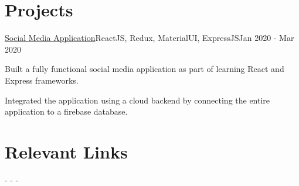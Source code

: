\documentclass[letterpaper]{resume_config}
\begin{document}
\section{Projects}
\Project
    {\href{https://github.com/yk-2310/Social-app}{Social Media Application}}{ReactJS, Redux, MaterialUI, ExpressJS}{Jan 2020 - Mar 2020}
    {
        \item {Built a fully functional social media application as part of learning React and Express frameworks.}
        \item {Integrated the application using a cloud backend by connecting the entire application to a firebase database.}
    }

\vspace{-5pt}
\section{Relevant Links}
-  
-  
- 
\end{document}
